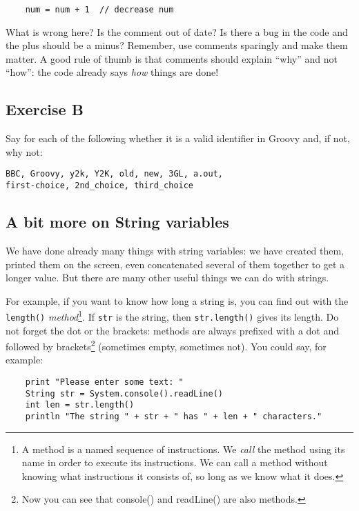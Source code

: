\begin{verbatim}
    num = num + 1  // decrease num
\end{verbatim}

What is wrong here? Is the comment out of date? Is there a bug in the
code and the plus should be a minus? Remember, use comments sparingly
and make them matter. A good rule of thumb is that comments should
explain ``why'' and not ``how'': the code already says \emph{how}
things are done! 

\subsection*{Exercise B}

Say for each of the following whether it is a valid identifier
in Groovy and, if not, why not:
\begin{Verbatim}
BBC, Groovy, y2k, Y2K, old, new, 3GL, a.out, 
first-choice, 2nd_choice, third_choice
\end{Verbatim}

\subsection{A bit more on String variables}

We have done already many things with string variables: we have
created them, printed them on the screen, even concatenated several of
them together to get a longer value. But there are many other useful
things we can do with strings.

For example, if you want to know how long a string is, you can find
out with the \verb!length()! 
{\em method}\footnote{A method is a named sequence of instructions. We 
{\em call} the method using its name in order to execute its instructions.
We can call a method without knowing what instructions it consists of, so
long as we know what it does.}. 
If  \verb!str! is the string, then \verb!str.length()! gives its 
length. Do not forget the dot or the brackets: methods are always 
prefixed with a dot and followed by brackets\footnote{Now you can see that
  console() and readLine() are also methods.} (sometimes empty,
sometimes not). You could say, for example:

\begin{Verbatim}
    print "Please enter some text: "
    String str = System.console().readLine()
    int len = str.length()
    println "The string " + str + " has " + len + " characters."
\end{Verbatim}

